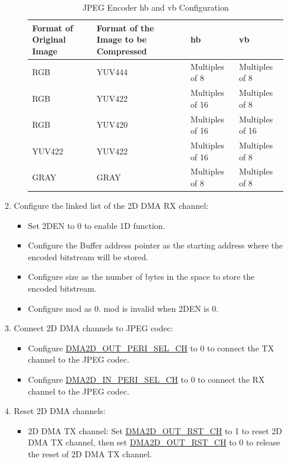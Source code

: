 \documentclass[main\_\_EN.tex]{subfiles}
\begin{document}
\begin{enumerate}
\begin{enumerate}
\begin{itemize}
\begin{longtable}{ | L{4cm} | L{4cm} | l | l |}
        \caption{JPEG Encoder hb and vb Configuration} \label{tab:en_hb_vb}
        \\ \hline
        \textbf{Format of Original Image} & \textbf{Format of the Image to be Compressed}  &  \textbf{hb}  &  \textbf{vb}\\ \hline
        RGB  &  YUV444 &  Multiples of 8 &  Multiples of 8  \\ \hline
        RGB  &  YUV422 &  Multiples of 16 &  Multiples of 8  \\ \hline
        RGB  &  YUV420 &  Multiples of 16 &  Multiples of 16  \\ \hline
        YUV422  &  YUV422 &  Multiples of 16 &  Multiples of 8  \\ \hline
        GRAY  &  GRAY &  Multiples of 8 &  Multiples of 8  \\ \hline
        \end{longtable}
        \end{itemize}
        \item Configure the linked list of the 2D DMA RX channel:
        \begin{itemize}
            \item Set 2DEN to 0 to enable 1D function.
            \item Configure the Buffer address pointer as the starting address where the encoded bitstream will be stored.
            \item Configure size as the number of bytes in the space to store the encoded bitstream.
            \item Configure mod as 0. mod is invalid when 2DEN is 0.
        \end{itemize}
        \item Connect 2D DMA channels to JPEG codec:
        \begin{itemize}
            \item Configure \hyperref[fielddesc:DMA2DOUTPERISELCHN]{DMA2D\_OUT\_PERI\_SEL\_CH} to 0 to connect the TX channel to the JPEG codec.
            \item Configure \hyperref[fielddesc:DMA2DINPERISELCHN]{DMA2D\_IN\_PERI\_SEL\_CH} to 0 to connect the RX channel to the JPEG codec.
        \end{itemize}
        \item Reset 2D DMA channels:
        \begin{itemize}
            \item 2D DMA TX channel: Set \hyperref[fielddesc:DMA2DOUTRSTCHN]{DMA2D\_OUT\_RST\_CH} to 1 to reset 2D DMA TX channel, then set \hyperref[fielddesc:DMA2DOUTRSTCHN]{DMA2D\_OUT\_RST\_CH} to 0 to release the reset of 2D DMA TX channel.

\end{itemize}
\end{enumerate}
\end{enumerate}
\end{document}
